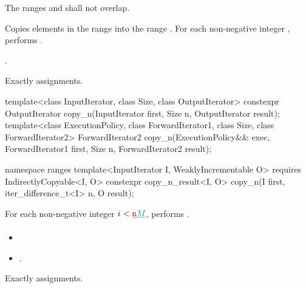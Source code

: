 \begin{itemdescr}
\pnum
\requires The ranges  and
 shall not overlap.

\pnum
\effects Copies elements in the range  into
the range .
For each non-negative integer
,
performs .

\pnum
\returns {}.

\pnum
\complexity Exactly  assignments.
\end{itemdescr}

%
\begin{itemdecl}
template<class InputIterator, class Size, class OutputIterator>
  constexpr OutputIterator copy_n(InputIterator first, Size n,
                                  OutputIterator result);
template<class ExecutionPolicy, class ForwardIterator1, class Size, class ForwardIterator2>
  ForwardIterator2 copy_n(ExecutionPolicy&& exec,
                          ForwardIterator1 first, Size n,
                          ForwardIterator2 result);
\end{itemdecl}\begin{addedblock}\begin{itemdecl}
namespace ranges {
  template<InputIterator I, WeaklyIncrementable O>
    requires IndirectlyCopyable<I, O>
    constexpr copy_n_result<I, O>
      copy_n(I first, iter_difference_t<I> n, O result);
}
\end{itemdecl}\end{addedblock}


\begin{itemdescr}
\pnum
{}

\pnum
\effects For each non-negative integer
$i < \changed{\tcode{n}}{M}$, performs .

\pnum
\returns
\begin{itemize}
\item {}
\item {}.
\end{itemize}

\pnum
\complexity Exactly  assignments.
\end{itemdescr}

